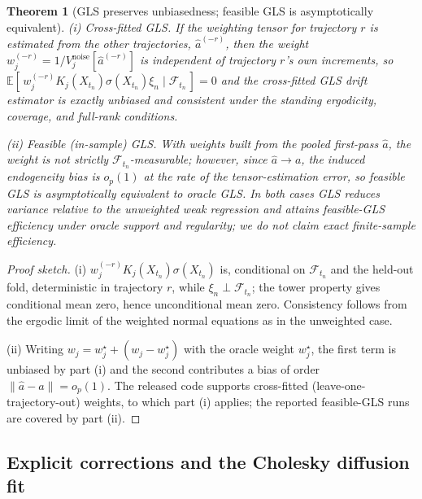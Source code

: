 \documentclass[11pt]{article}
\newtheorem{theorem}{Theorem}
\newcommand{\E}{\mathbb{E}}
\newcommand{\diff}{a}
\newcommand{\Kj}{K_j}
\begin{document}
\begin{theorem}[GLS preserves unbiasedness; feasible GLS is asymptotically
equivalent]\label{thm:unbiased}
\emph{(i) Cross-fitted GLS.} If the weighting tensor for trajectory $r$ is estimated from the
other trajectories, $\hat\diff^{(-r)}$, then the weight
$w_j^{(-r)}=1/V^{\mathrm{noise}}_j[\hat\diff^{(-r)}]$ is independent of trajectory $r$'s own
increments, so
$\E[\,w_j^{(-r)}\Kj(X_{t_n})\sigma(X_{t_n})\xi_n\mid\mathcal{F}_{t_n}\,]=0$ and the
cross-fitted GLS drift estimator is exactly unbiased and consistent under the standing
ergodicity, coverage, and full-rank conditions.

\emph{(ii) Feasible (in-sample) GLS.} With weights built from the pooled first-pass $\hat\diff$,
the weight is not strictly $\mathcal{F}_{t_n}$-measurable; however, since $\hat\diff\to\diff$,
the induced endogeneity bias is $o_p(1)$ at the rate of the tensor-estimation error, so feasible
GLS is asymptotically equivalent to oracle GLS. In both cases GLS \emph{reduces variance}
relative to the unweighted weak regression and attains feasible-GLS efficiency under oracle
support and regularity; we do not claim exact finite-sample efficiency.
\end{theorem}

\begin{proof}[Proof sketch]
(i) $w_j^{(-r)}\Kj(X_{t_n})\sigma(X_{t_n})$ is, conditional on $\mathcal{F}_{t_n}$ and the
held-out fold, deterministic in trajectory $r$, while $\xi_n\perp\mathcal{F}_{t_n}$; the tower
property gives conditional mean zero, hence unconditional mean zero. Consistency follows from
the ergodic limit of the weighted normal equations as in the unweighted case.

(ii) Writing $w_j=w_j^\star+(w_j-w_j^\star)$ with the oracle weight $w_j^\star$, the first term
is unbiased by part (i) and the second contributes a bias of order
$\|\hat\diff-\diff\|=o_p(1)$. The released code supports cross-fitted
(leave-one-trajectory-out) weights, to which part (i) applies; the reported feasible-GLS runs
are covered by part (ii).
\end{proof}

\subsection{Explicit corrections and the Cholesky diffusion fit}\label{sec:cholesky}
\end{document}
